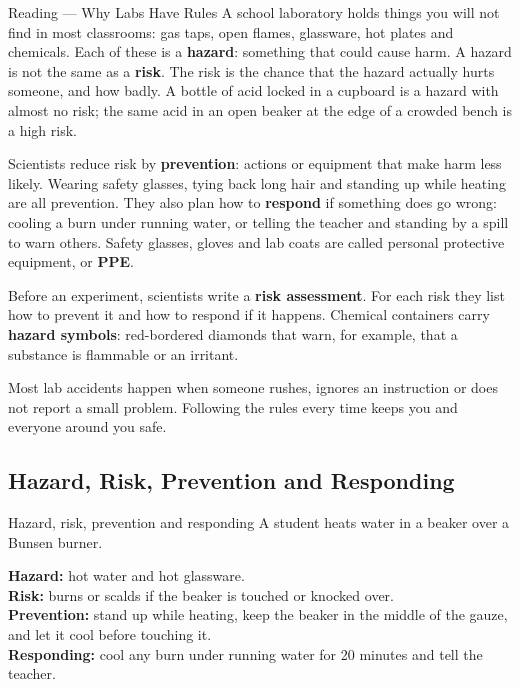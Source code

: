 \begin{readingbox}{Reading --- Why Labs Have Rules}
A school laboratory holds things you will not find in most classrooms: gas taps, open flames, glassware, hot plates and chemicals. Each of these is a \textbf{hazard}: something that could cause harm. A hazard is not the same as a \textbf{risk}. The risk is the chance that the hazard actually hurts someone, and how badly. A bottle of acid locked in a cupboard is a hazard with almost no risk; the same acid in an open beaker at the edge of a crowded bench is a high risk.

Scientists reduce risk by \textbf{prevention}: actions or equipment that make harm less likely. Wearing safety glasses, tying back long hair and standing up while heating are all prevention. They also plan how to \textbf{respond} if something does go wrong: cooling a burn under running water, or telling the teacher and standing by a spill to warn others. Safety glasses, gloves and lab coats are called personal protective equipment, or \textbf{PPE}.

Before an experiment, scientists write a \textbf{risk assessment}. For each risk they list how to prevent it and how to respond if it happens. Chemical containers carry \textbf{hazard symbols}: red-bordered diamonds that warn, for example, that a substance is flammable or an irritant.

Most lab accidents happen when someone rushes, ignores an instruction or does not report a small problem. Following the rules every time keeps you and everyone around you safe.
\end{readingbox}

\rcreset
{}

\label{theory:5}

\subsection{Hazard, Risk, Prevention and Responding}\label{sub:5.1}

\begin{workedex}{Hazard, risk, prevention and responding}
A student heats water in a beaker over a Bunsen burner.

\smallskip
\textbf{Hazard:} hot water and hot glassware.\\
\textbf{Risk:} burns or scalds if the beaker is touched or knocked over.\\
\textbf{Prevention:} stand up while heating, keep the beaker in the middle of the gauze, and let it cool before touching it.\\
\textbf{Responding:} cool any burn under running water for 20 minutes and tell the teacher.
\end{workedex}

